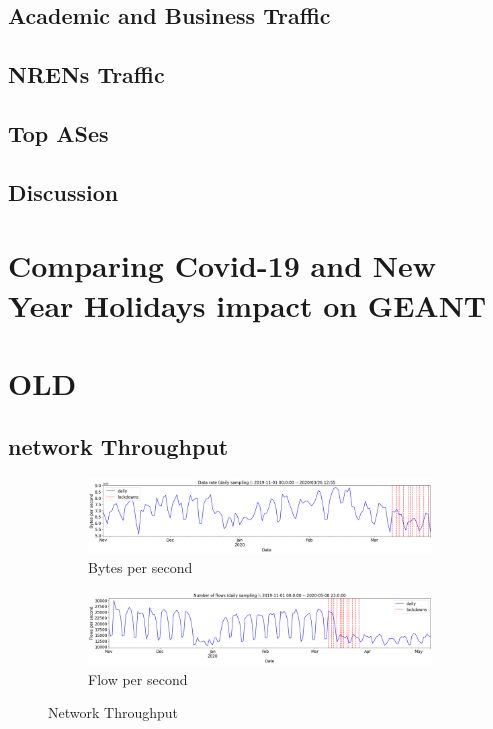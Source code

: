 \documentclass[10pt, journal, letterpaper]{IEEEtran}
\newcommand\linearFigSze{0.48}
\begin{document}
\subsection{Academic and Business Traffic}

\subsection{NRENs Traffic}

\subsection{Top ASes}

\subsection{Discussion}

\section{Comparing Covid-19 and New Year Holidays impact on GEANT}




\section{OLD}
\subsection{network Throughput}


\begin{figure}
    \begin{subfigure}{\linearFigSze\textwidth}
          \centering
          \includegraphics[width=\columnwidth]{img/traffic_trend_bps.png}
          \caption{Bytes per second}
          \label{fig:traffic_trend_bps}
    \end{subfigure}
    \begin{subfigure}{\linearFigSze\textwidth}
          \centering
          \includegraphics[width=\columnwidth]{img/traffic_trend_fps.png}
          \caption{Flow per second}
          \label{fig:traffic_trend_fps}
    \end{subfigure}
    \caption{Network Throughput}
    \label{fig:network_throughput}
\end{figure}
\end{document}
